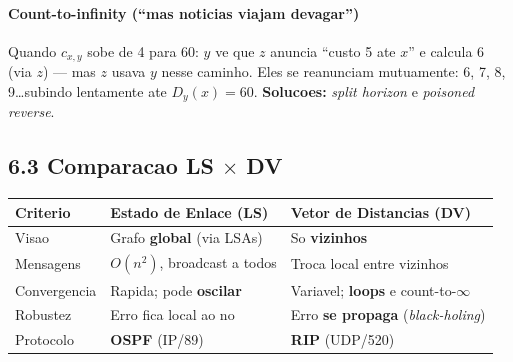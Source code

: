 \documentclass[11pt,a4paper]{article}
\begin{document}
\begin{explicacao}
\paragraph{Count-to-infinity (``mas noticias viajam devagar'')}

\begin{center}
\par{}
\end{center}

Quando $c_{x,y}$ sobe de 4 para 60: $y$ ve que $z$ anuncia ``custo 5 ate $x$'' e calcula 6 (via $z$) --- mas $z$ usava $y$ nesse caminho. Eles se reanunciam mutuamente: 6, 7, 8, 9\ldots subindo lentamente ate $D_y(x)=60$. \textbf{Solucoes:} \textit{split horizon} e \textit{poisoned reverse}.

\subsection*{6.3 Comparacao LS $\times$ DV}

\begin{center}
\begin{tabular}{lp{5cm}p{5.5cm}}
\toprule
\textbf{Criterio} & \textbf{Estado de Enlace (LS)} & \textbf{Vetor de Distancias (DV)} \\
\midrule
Visao        & Grafo \textbf{global} (via LSAs)       & So \textbf{vizinhos} \\
Mensagens    & $O(n^2)$, broadcast a todos            & Troca local entre vizinhos \\
Convergencia & Rapida; pode \textbf{oscilar}          & Variavel; \textbf{loops} e count-to-$\infty$ \\
Robustez     & Erro fica local ao no                  & Erro \textbf{se propaga} (\textit{black-holing}) \\
Protocolo    & \textbf{OSPF} (IP/89)                  & \textbf{RIP} (UDP/520) \\
\bottomrule
\end{tabular}
\end{center}

\end{explicacao}
\end{document}
